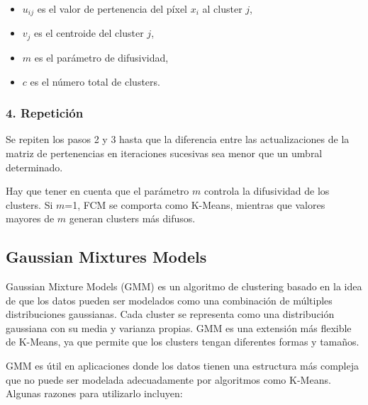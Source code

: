 \begin{itemize}
\setlength{\itemsep}{-1ex}
   \item{\begin{flushleft} $u_{ij}$ es el valor de pertenencia del píxel $x_i$ al cluster $j$, \end{flushleft}}
   \item{\begin{flushleft} $v_j$ es el centroide del cluster $j$, \end{flushleft}}
   \item{\begin{flushleft} $m$ es el parámetro de difusividad, \end{flushleft}}
   \item{\begin{flushleft} $c$ es el número total de clusters. \end{flushleft}}
\end{itemize}

\subsubsection{4. Repetición}

Se repiten los pasos 2 y 3 hasta que la diferencia entre las actualizaciones de la matriz de pertenencias en iteraciones sucesivas sea menor que un umbral determinado.

Hay que tener en cuenta que el parámetro $m$ controla la difusividad de los clusters. Si $m$=1, FCM se comporta como K-Means, mientras que valores mayores de $m$ generan clusters más difusos.

\subsection{Gaussian Mixtures Models}\label{gaussian-mixtures-models}
Gaussian Mixture Models (GMM) \cite{MATLAB:2023bGMM} es un algoritmo de clustering basado en la idea de que los datos pueden ser modelados como una combinación de múltiples distribuciones gaussianas. Cada cluster se representa como una distribución gaussiana con su media y varianza propias. GMM es una extensión más flexible de K-Means, ya que permite que los clusters tengan diferentes formas y tamaños.

GMM es útil en aplicaciones donde los datos tienen una estructura más compleja que no puede ser modelada adecuadamente por algoritmos como K-Means. Algunas razones para utilizarlo incluyen:

